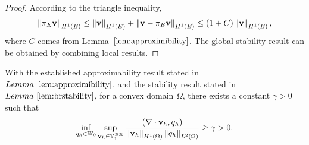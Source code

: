 \begin{proof}

According to the triangle inequality,
		  \begin{equation}
					 \left\lVert\pi_E \mathbf{v}\right\rVert_{H^1(E)} \leq \left\lVert\mathbf{v}\right\rVert_{H^1(E)} + 
					 \left\lVert\mathbf{v} - \pi_E \mathbf{v}\right\rVert_{H^1(E)} \leq (1+C) \left\lVert\mathbf{v}\right\rVert_{H^1(E)},
		  \end{equation}
		  where $C$ comes from Lemma~$\ref{lem:approximibility}$.
	 The global stability result can be obtained by combining local results.
\end{proof}
\begin{thm}
With the established approximability result stated in $Lemma~\ref{lem:approximibility}$, and 
		  the stability result stated in $Lemma~\ref{lem:brstability}$,
for a convex domain $\Omega$, there exists a constant $\gamma > 0$ such that
		  \begin{equation}
					 \inf_{q_h \in \mathbb{W}_0} \sup_{\mathbf{v}_h \in \mathbb{V}_1^{\mathcal{BR}}} \frac{(\nabla \cdot \mathbf{v}_h, q_h)}{\left\lVert\mathbf{v}_h\right\rVert_{H^1(\Omega)}\left\lVert q_h\right\rVert_{L^2(\Omega)}} \geq \gamma >0.
		  \end{equation}
\end{thm}
